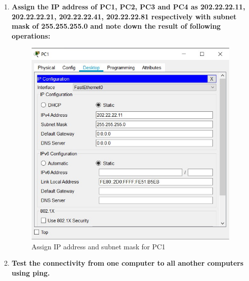 \documentclass[a4paper,11pt]{article}
\begin{document}
\begin{enumerate}
    \item \textbf{ Assign the IP address of PC1, PC2, PC3 and PC4 as 202.22.22.11, 202.22.22.21,
              202.22.22.41, 202.22.22.81 respectively with subnet mask of 255.255.255.0 and note down
              the result of following operations:}
          \begin{figure}[H]
              \centering
              \includegraphics[scale=0.8,cframe=blue 0.5pt 3pt]{./FIG/APC1.jpg}
              \caption{Assign IP address and subnet mask for PC1}
          \end{figure}



    \item \textbf{ Test the connectivity from one computer to all another computers using ping.}




\end{enumerate}
\end{document}
